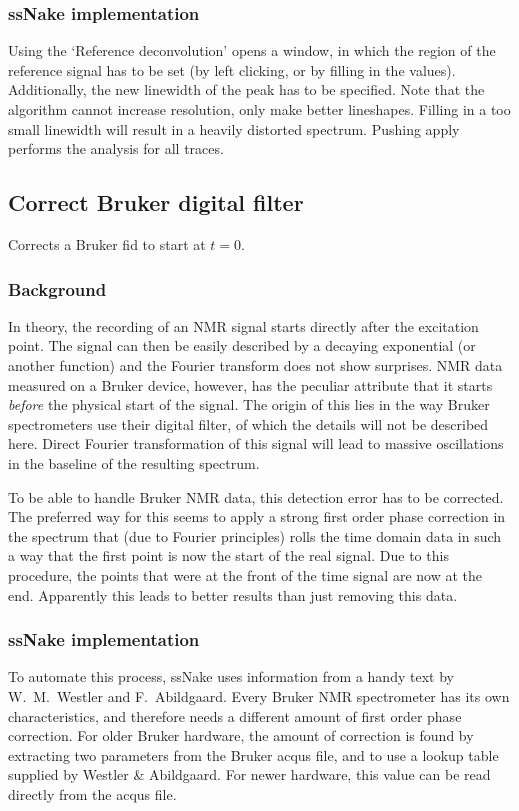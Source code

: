 \documentclass[11pt,a4paper]{article}
\begin{document}
\subsubsection*{ssNake implementation}
Using the `Reference deconvolution' opens a window, in which the region of the reference signal has to be set (by left clicking, or by filling in the values). Additionally, the new linewidth of the peak has to be specified. Note that the algorithm cannot increase resolution, only make better lineshapes. Filling in a too small linewidth will result in a heavily distorted spectrum. Pushing apply performs the analysis for all traces.

\subsection{Correct Bruker digital filter}
Corrects a Bruker fid to start at $t=0$.

\subsubsection*{Background}
In theory, the recording of an NMR signal starts directly after the excitation point. The signal can then be easily described by a decaying exponential (or another function) and the Fourier transform does not show surprises. NMR data measured on a Bruker device, however, has the peculiar attribute that it starts \textit{before} the physical start of the signal. The origin of this lies in the way Bruker spectrometers use their digital filter, of which the details will not be described here. Direct Fourier transformation of this signal will lead to massive oscillations in the baseline of the resulting spectrum.

To be able to handle Bruker NMR data, this detection error has to be corrected. The preferred way for this seems to apply a strong first order phase correction in the spectrum that (due to Fourier principles) rolls the time domain data in such a way that the first point is now the start of the real signal. Due to this procedure, the points that were at the front of the time signal are now at the end. Apparently this leads to better results than just removing this data.

\subsubsection*{ssNake implementation}
To automate this process, ssNake uses information from a handy text by W.\ M.\ Westler and F.\ Abildgaard. Every Bruker NMR spectrometer has its own characteristics, and therefore needs a different amount of first order phase correction. For older Bruker hardware, the amount of correction is found by extracting two parameters from the Bruker acqus file, and to use a lookup table supplied by Westler \& Abildgaard. For newer hardware, this value can be read directly from the acqus file.
\end{document}

